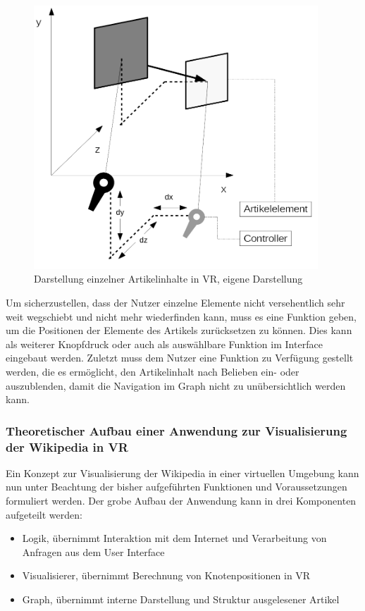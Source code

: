 \documentclass[12pt, a4paper]{article}
\begin{document}
\begin{figure}[h!]
\centering
\includegraphics[width=0.95\textwidth]{interactionVR.png}
\caption[Darstellung einzelner Artikelinhalte in VR]{Darstellung einzelner Artikelinhalte in VR, eigene Darstellung}
\label{articleInVR}
\end{figure}
Um sicherzustellen, dass der Nutzer einzelne Elemente nicht versehentlich sehr weit wegschiebt und nicht mehr wiederfinden kann, muss es eine Funktion geben, um die Positionen der Elemente des Artikels zurücksetzen zu können. Dies kann als weiterer Knopfdruck oder auch als auswählbare Funktion im Interface eingebaut werden. Zuletzt muss dem Nutzer eine Funktion zu Verfügung gestellt werden, die es ermöglicht, den Artikelinhalt nach Belieben ein- oder auszublenden, damit die Navigation im Graph nicht zu unübersichtlich werden kann.\\

\subsubsection{Theoretischer Aufbau einer Anwendung zur Visualisierung der Wikipedia in VR}
Ein Konzept zur Visualisierung der Wikipedia in einer virtuellen Umgebung kann nun unter Beachtung der bisher aufgeführten Funktionen und Voraussetzungen formuliert werden.
Der grobe Aufbau der Anwendung kann in drei Komponenten aufgeteilt werden:
\begin{itemize}
\item Logik, übernimmt Interaktion mit dem Internet und Verarbeitung von Anfragen aus dem User Interface
\item Visualisierer, übernimmt Berechnung von Knotenpositionen in VR
\item Graph, übernimmt interne Darstellung und Struktur ausgelesener Artikel
\end{itemize}
\end{document}

